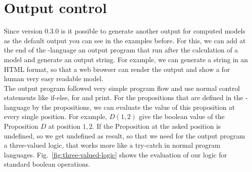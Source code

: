 \documentclass[twoside]{article}
\begin{document}
\section{Output control}
    Since \DiMo version 0.3.0 is it possible to generate another output for computed models as the default output you can see in the examples before. For this, we can add at the end of the \DiMo-language an output program that run after the calculation of a model and generate an output string. For example, we can generate a string in an HTML format, so that a web browser can render the output and show a for human very easy readable model. \\
    The output program followed very simple program flow and use normal control statements like if-else, for and print. For the propositions that are defined in the \DiMo-language by the propositions, we can evaluate the value of this proposition at every single position. For example, $D(1,2)$ give the boolean value of the Proposition $D$ at position $1,2$. If the Proposition at the asked position is undefined, so we get undefined as result, so that we need for the output program a three-valued logic, that works more like a try-catch in normal program languages. Fig.~\ref{fig:three-valued-logic} shows the evaluation of our logic for standard boolean operations.
\end{document}
